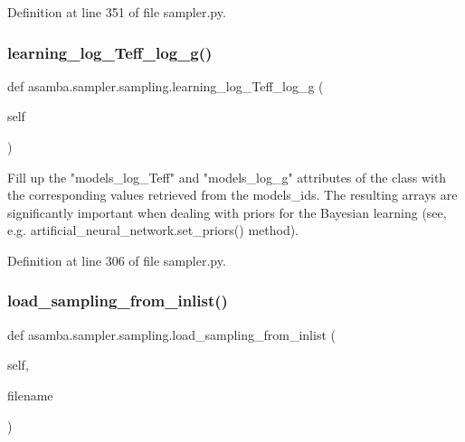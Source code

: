 Definition at line 351 of file sampler.\+py.

\mbox{\label{classasamba_1_1sampler_1_1sampling_ae9c349cf7e5114f9675f07e5b97ed628}} 
\subsubsection{\texorpdfstring{learning\+\_\+log\+\_\+\+Teff\+\_\+log\+\_\+g()}{learning\_log\_Teff\_log\_g()}}
{\footnotesize\ttfamily def asamba.\+sampler.\+sampling.\+learning\+\_\+log\+\_\+\+Teff\+\_\+log\+\_\+g (\begin{DoxyParamCaption}\item[{}]{self }\end{DoxyParamCaption})}

\begin{DoxyVerb}Fill up the "models_log_Teff" and "models_log_g" attributes of the class with the corresponding values retrieved
from the models_ids. The resulting arrays are significantly important when dealing with priors for the Bayesian
learning (see, e.g. artificial_neural_network.set_priors() method).
\end{DoxyVerb}
 

Definition at line 306 of file sampler.\+py.

\mbox{\label{classasamba_1_1sampler_1_1sampling_a55ebddb5056b66524d34341cccae5d05}} 
\subsubsection{\texorpdfstring{load\+\_\+sampling\+\_\+from\+\_\+inlist()}{load\_sampling\_from\_inlist()}}
{\footnotesize\ttfamily def asamba.\+sampler.\+sampling.\+load\+\_\+sampling\+\_\+from\+\_\+inlist (\begin{DoxyParamCaption}\item[{}]{self,  }\item[{}]{filename }\end{DoxyParamCaption})}


